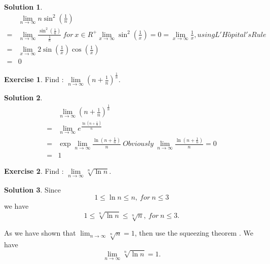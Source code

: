 \documentclass{article}
\theoremstyle{definition}
\newtheorem{exe}{Exercise}[section]
\newtheorem{sol}{Solution}[exe]
\begin{document}
\begin{sol}
    \begin{align*}
        &\underset{n \to \infty}{\lim}n\sin^{2}(\frac{1}{n})\\
        =& \underset{n \to \infty}{\lim}\frac{\sin^{2}(\frac{1}{n})}{\frac{1}{n}}\ for\ x\in R^{+} \lim_{x\to \infty}\sin^{2}(\frac{1}{x})=0=\lim_{x\to \infty}\frac{1}{x}, using L'Hôpital's Rule \\
        =& \underset{x \to \infty}{\lim} 2\sin(\frac{1}{x})\cos(\frac{1}{x})\\
        =& 0
    \end{align*}
\end{sol}


\begin{exe}
    Find : $\underset{n \to \infty}{\lim}(n+\frac{1}{n})^{\frac{1}{n}}.$
\end{exe}

\begin{sol}
    \begin{align*}
        &\underset{n \to \infty}{\lim}(n+\frac{1}{n})^{\frac{1}{n}}\\
        =& \underset{n \to \infty}{\lim}e^{\frac{\ln(n+\frac{1}{n})}{n}}\  \\
        =& \exp{\underset{n \to \infty}{\lim}\frac{\ln(n+\frac{1}{n})}{n}}\ Obviously\ \underset{n \to \infty}{\lim}\frac{\ln(n+\frac{1}{n})}{n}=0 \\
        =& 1
    \end{align*}
\end{sol}


\begin{exe}
    Find : $\underset{n \to \infty}{\lim}\sqrt[n]{\ln n}.$
\end{exe}

\begin{sol}
Since $$1\leq \ln n\leq n,\ for\ n\leq 3$$
we have $$1\leq \sqrt[n]{\ln n}\leq \sqrt[n]{n},\ for\ n\leq 3.$$

As we have shown that $\lim_{n\to \infty}\sqrt[n]{n}=1$, then use the squeezing theorem . We have $$\underset{n \to \infty}{\lim}\sqrt[n]{\ln n}=1.$$

\end{sol}
\end{document}
